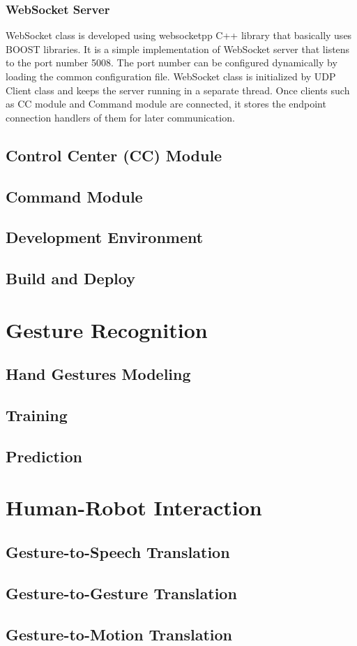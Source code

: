 \subsubsection{WebSocket Server}
WebSocket class is developed using websocketpp C++ library that basically uses BOOST libraries. It is a simple implementation of WebSocket server that listens to the port number 5008. The port number can be configured dynamically by loading the common configuration file. WebSocket class is initialized by UDP Client class and keeps the server running in a separate thread. Once clients such as CC module and Command module are connected, it stores the endpoint connection handlers of them for later communication. 


\subsection{Control Center (CC) Module}

\subsection{Command Module} 

\subsection{Development Environment} 

\subsection{Build and Deploy}

\section{Gesture Recognition}

\subsection{Hand Gestures Modeling}

\subsection{Training}

\subsection{Prediction}

\section{Human-Robot Interaction}

\subsection{Gesture-to-Speech Translation}

\subsection{Gesture-to-Gesture Translation}

\subsection{Gesture-to-Motion Translation}


